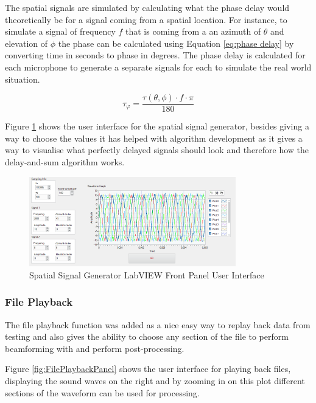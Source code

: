 \documentclass{UoNMCHA}
\numberwithin{equation}{section}
\begin{document}
    The spatial signals are simulated by calculating what the phase delay would theoretically be for a signal coming from a spatial location. For instance, to simulate a signal of frequency $f$ that is coming from a an azimuth of $\theta$ and elevation of $\phi$ the phase can be calculated using Equation \ref{eq:phase delay} by converting time in seconds to phase in degrees. The phase delay is calculated for each microphone to generate a separate signals for each to simulate the real world situation.
    
    \begin{equation}
        \tau_{\varphi} = \frac{\tau(\theta,\phi) \cdot f \cdot \pi}{180}
        \label{eq:phase delay}
    \end{equation}
    
    Figure \ref{fig:SignalGenPanel} shows the user interface for the spatial signal generator, besides giving a way to choose the values it has helped with algorithm development as it gives a way to visualise what perfectly delayed signals should look and therefore how the delay-and-sum algorithm works.
    
    \begin{figure}[H]
        \centering
        \includegraphics[keepaspectratio, width = 0.8\textwidth]{Figures/SignalGenPanel_5ULA50mm.png}
        \caption{Spatial Signal Generator LabVIEW Front Panel User Interface}
        \label{fig:SignalGenPanel}
    \end{figure}    

\subsubsection{File Playback} \label{sec:File Playback}

The file playback function was added as a nice easy way to replay back data from testing and also gives the ability to choose any section of the file to perform beamforming with and perform post-processing.

Figure \ref{fig:FilePlaybackPanel} shows the user interface for playing back files, displaying the sound waves on the right and by zooming in on this plot different sections of the waveform can be used for processing.
\end{document}
